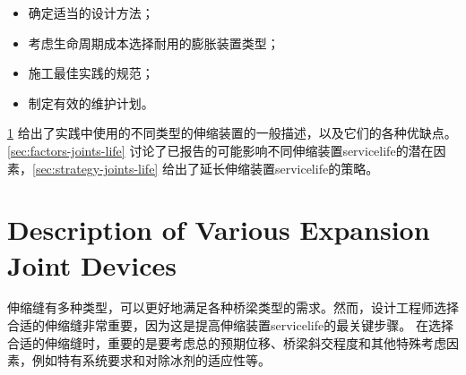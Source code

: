 \begin{itemize}
  \item 确定适当的设计方法；
  \item 考虑生命周期成本选择耐用的膨胀装置类型；
  \item 施工最佳实践的规范；
  \item 制定有效的维护计划。
\end{itemize}


\cref{sec:expansion-joint-description} 给出了实践中使用的不同类型的伸缩装置的一般描述，以及它们的各种优缺点。\cref{sec:factors-joints-life} 讨论了已报告的可能影响不同伸缩装置\gls*{servicelife}的潜在因素，\cref{sec:strategy-joints-life} 给出了延长伸缩装置\gls*{servicelife}的策略。

\section{Description of Various Expansion Joint Devices}\label{sec:expansion-joint-description}
伸缩缝有多种类型，可以更好地满足各种桥梁类型的需求。然而，设计工程师选择合适的伸缩缝非常重要，因为这是提高伸缩装置\gls*{servicelife}的最关键步骤。 在选择合适的伸缩缝时，重要的是要考虑总的预期位移、桥梁斜交程度和其他特殊考虑因素，例如特有系统要求和对除冰剂的适应性等。


